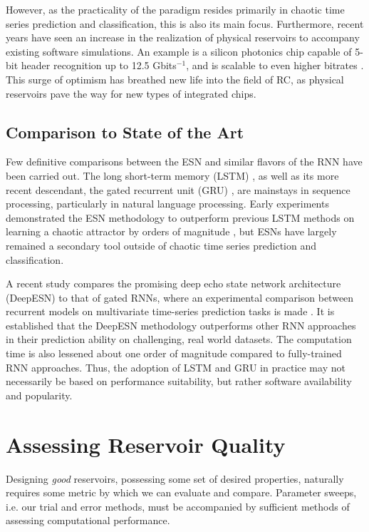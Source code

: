 However, as the practicality of the paradigm resides primarily in chaotic time
series prediction and classification, this is also its main focus. Furthermore,
recent years have seen an increase in the realization of physical reservoirs to
accompany existing software simulations. An example is a silicon photonics chip
capable of 5-bit header recognition up to 12.5 Gbits$^{-1}$, and is scalable to
even higher bitrates \cite{vandoorne_experimental_2014}. This surge of optimism
has breathed new life into the field of RC, as physical reservoirs pave the way
for new types of integrated chips.

\subsection{Comparison to State of the Art}

Few definitive comparisons between the ESN and similar flavors of the RNN have
been carried out. The long short-term memory (LSTM) \cite{hochreiter_long_1997},
as well as its more recent descendant, the gated recurrent unit (GRU)
\cite{cho_learning_2014}, are mainstays in sequence processing, particularly in
natural language processing. Early experiments demonstrated the ESN methodology
to outperform previous LSTM methods on learning a chaotic attractor by orders of
magnitude \cite{jaeger_echo_2001}, but ESNs have largely remained a secondary
tool outside of chaotic time series prediction and classification.

A recent study compares the promising deep echo state network architecture
(DeepESN) to that of gated RNNs, where an experimental comparison between
recurrent models on multivariate time-series prediction tasks is made
\cite{gallicchio_comparison_2019}. It is established that the DeepESN
methodology outperforms other RNN approaches in their prediction ability on
challenging, real world datasets. The computation time is also lessened about
one order of magnitude compared to fully-trained RNN approaches. Thus, the
adoption of LSTM and GRU in practice may not necessarily be based on performance
suitability, but rather software availability and popularity.

\section{Assessing Reservoir Quality}
\label{sec:benchmark}

Designing \textit{good} reservoirs, possessing some set of desired properties,
naturally requires some metric by which we can evaluate and compare. Parameter
sweeps, i.e. our trial and error methods, must be accompanied by sufficient
methods of assessing computational performance.

